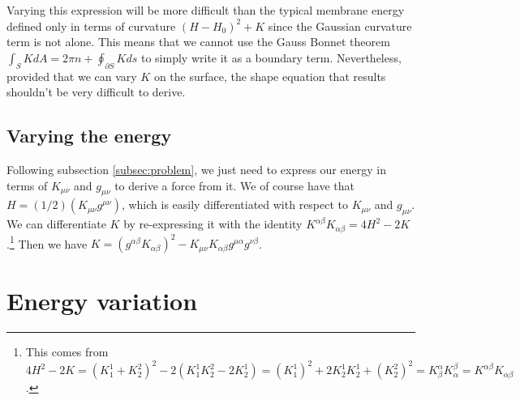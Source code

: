 Varying this expression will be more difficult than the typical membrane energy defined only in terms of curvature $(H-H_0)^2 + K$ since the Gaussian curvature term is not alone. This means that we cannot use the Gauss Bonnet theorem $\int_S K dA = 2\pi n + \oint_{\partial S}K ds$ to simply write it as a boundary term. Nevertheless, provided that we can vary $K$ on the surface, the shape equation that results shouldn't be very difficult to derive.

\subsection{Varying the energy}

Following subsection \ref{subsec:problem}, we just need to express our energy in terms of $K_{\mu\nu}$ and $g_{\mu\nu}$ to derive a force from it. We of course have that $H = (1/2) (K_{\mu\nu} g^{\mu\nu})$, which is easily differentiated with respect to $K_{\mu\nu}$ and $g_{\mu\nu}$. We can differentiate $K$ by re-expressing it with the identity $K^{\alpha\beta}K_{\alpha\beta} = 4H^2 - 2K$.\footnote{This comes from $4H^2 - 2K = (K^1_1 + K^2_2)^2 - 2(K^1_1K^2_2 - 2K^1_2) = (K^1_1)^2 + 2 K^1_2K^1_2 + (K^2_2)^2 = K^\alpha_\beta K_\alpha^\beta = K^{\alpha\beta}K_{\alpha\beta}$.} Then we have $K = (g^{\alpha\beta}K_{\alpha\beta})^2 - K_{\mu\nu}K_{\alpha\beta}g^{\mu\alpha}g^{\nu\beta}$.

\section{Energy variation}


